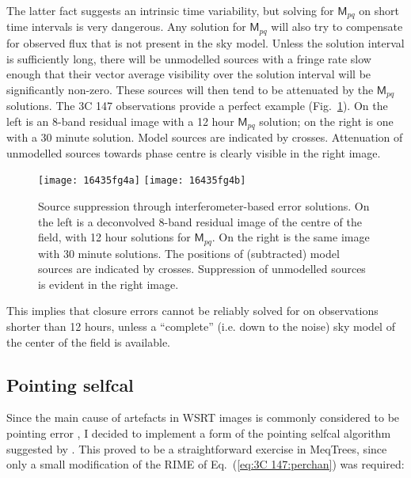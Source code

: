 \documentclass{aa}
\newcommand{\coh}[2]{\mathsf{{#1}}_{{#2}}}
\begin{document}
The latter fact suggests an intrinsic time variability, but solving for $\coh{M}{pq}$ on short time intervals is very dangerous. Any solution for $\coh{M}{pq}$ will also try to compensate for observed flux that is not present in the sky model. Unless the solution interval is sufficiently long, there will be unmodelled sources with a fringe rate slow enough that their vector average visibility over the solution interval will be significantly non-zero. These sources will then tend to be attenuated by the $\coh{M}{pq}$ solutions. The 3C 147 observations provide a perfect example (Fig.~\ref{fig:source-suppression}). On the left is an 8-band residual image with a 12 hour $\coh{M}{pq}$ solution; on the right is one with a 30 minute solution. Model sources are indicated by crosses. Attenuation of unmodelled sources towards phase centre is clearly visible in the right image. 

\begin{figure}
\begin{centering}
\texttt{[image: 16435fg4a]}%
\texttt{[image: 16435fg4b]}\par
\end{centering}
\caption{\label{fig:source-suppression}Source suppression through interferometer-based error solutions. On the left is a deconvolved 8-band residual image of the centre of the field, with 12 hour solutions for $\coh{M}{pq}$. On the right is the same image with 30 minute solutions. The positions of (subtracted) model sources are indicated by crosses. Suppression of unmodelled sources is evident in the right image.
}
\end{figure}


This implies that closure errors cannot be reliably solved for on observations shorter than 12 hours, unless a ``complete'' (i.e. down to the noise) sky model of the center of the field is available.

\subsection{Pointing selfcal\label{sec:3C 147:pointing}}

Since the main cause of artefacts in WSRT images is commonly considered to be pointing error \citep[see Paper II,][Sect.~2.1.4]{RRIME2}, I decided to implement a form of the pointing selfcal algorithm suggested by \citet{SB:pointing}. This proved to be a straightforward exercise in MeqTrees, since only a small modification of the RIME of Eq.~(\ref{eq:3C 147:perchan}) was required: 
\end{document}
